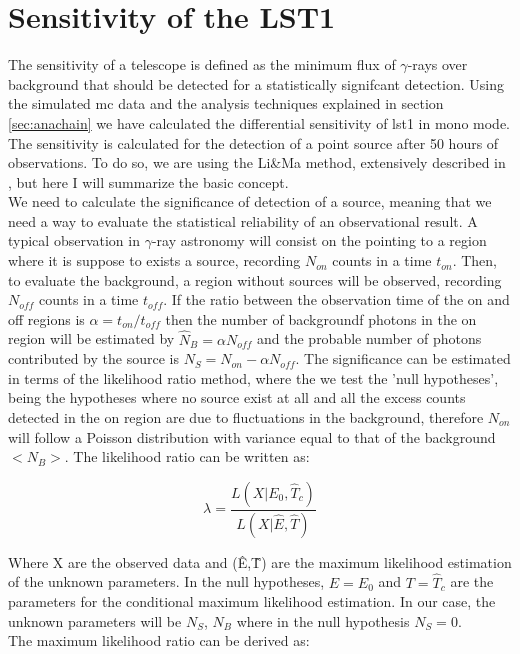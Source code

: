 \documentclass[main.tex]{subfiles}
\begin{document}
\section{Sensitivity of the LST1}

The sensitivity of a telescope is defined as the minimum flux of $\gamma$-rays over background that should be detected for a statistically signifcant detection. Using the simulated \gls{mc} data and the analysis techniques explained in section \ref{sec:anachain} we have calculated the differential sensitivity of \gls{lst}1 in mono mode.\\
The sensitivity is calculated for the detection of a point source after 50 hours of observations. To do so, we are using the Li\&Ma method, extensively described in \cite{1983LiMa}, but here I will summarize the basic concept.\\
We need to calculate the significance of detection of a source, meaning that we need a way to evaluate the statistical reliability of an observational result. A typical observation in $\gamma$-ray astronomy will consist on the pointing to a region where it is suppose to exists a source, recording $N_{on}$ counts in a time $t_{on}$. Then, to evaluate the background, a region without sources will be observed, recording $N_{off}$ counts in a time $t_{off}$. If the ratio between the observation time of the on and off regions is $\alpha = t_{on}/t_{off}$ then the number of backgroundf photons in the on region will be estimated by $\hat{N}_{B} = \alpha N_{off}$  and the probable number of photons contributed by the source is $N_{S} = N_{on}-\alpha N_{off}$. The significance can be estimated in terms of the likelihood ratio method, where the we test the 'null hypotheses', being the hypotheses where no source exist at all and all the excess counts detected in the on region are due to fluctuations in the background, therefore $N_{on}$ will follow a Poisson distribution with variance equal to that of the background $<N_{B}>$. The likelihood ratio can be written as:

\begin{equation}
  \lambda = \frac{L(X | E_{0}, \hat{T}_{c})}{L(X|\hat{E},\hat{T})}
\end{equation}

Where X are the observed data and (\^{E},\^{T}) are the maximum likelihood estimation of the unknown parameters. In the null hypotheses, $E=E_{0}$ and $T=\hat{T}_{c}$ are the parameters for the conditional maximum likelihood estimation. In our case, the unknown parameters will be $N_{S}$, $N_{B}$ where in the null hypothesis $N_{S}=0$.\\
The maximum likelihood ratio can be derived as:
\end{document}
